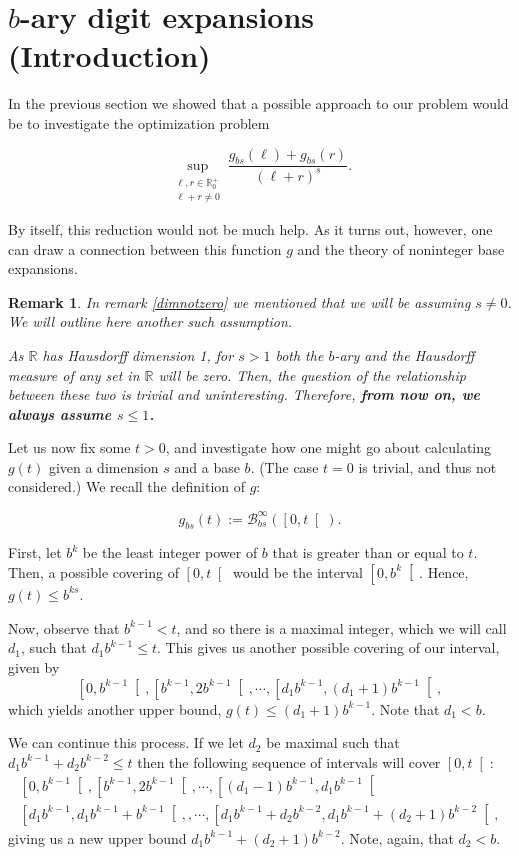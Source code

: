\documentclass[11pt, reqno]{amsart}
\newcommand{\R}{\mathbb{R}}
\newcommand{\BB}{\mathcal{B}}
\newtheorem{remark}{Remark}
\begin{document}
\section{$b$-ary digit expansions (Introduction)}\label{sec6}

In the previous section we showed that a possible approach to our problem would be to investigate the optimization problem

\[ \sup_{\substack{\ell,r \in \R^+_0\\\ell+r \neq 0}} \frac{g_{bs}(\ell) + g_{bs}(r)}{(\ell + r)^s}. \]

By itself, this reduction would not be much help. As it turns out, however, one can draw a connection between this function $g$ and the theory of noninteger base expansions.

\begin{remark}
In remark \ref{dimnotzero} we mentioned that we will be assuming $s \neq 0$. We will outline here another such assumption.

As $\R$ has Hausdorff dimension 1, for $s > 1$ both the $b$-ary and the Hausdorff measure of \emph{any} set in $\R$ will be zero. Then, the question of the relationship between these two is trivial and uninteresting. Therefore, \textbf{from now on, we always assume $s \leq 1$.}
\end{remark}

Let us now fix some $t > 0$, and investigate how one might go about calculating $g(t)$ given a dimension $s$ and a base $b$. (The case $t = 0$ is trivial, and thus not considered.) We recall the definition of $g$:

\[g_{bs}(t) := \BB_{bs}^\infty(\left[0, t \right[).\]

First, let $b^k$ be the least integer power of $b$ that is greater than or equal to $t$. Then, a possible covering of $\left[0, t \right[$ would be the interval $\left[0, b^k\right[$. Hence, $g(t) \leq b^{ks}$.

Now, observe that $b^{k-1} < t$, and so there is a maximal integer, which we will call $d_1$, such that $d_1 b^{k-1} \leq t$. This gives us another possible covering of our interval, given by
\[\left[0, b^{k-1} \right[, \left[b^{k-1}, 2 b^{k-1} \right[, \cdots, \left[d_1 b^{k-1}, (d_1 + 1) b^{k-1} \right[,\]
which yields another upper bound, $g(t) \leq (d_1 + 1) b^{k-1}$. Note that $d_1 < b$.

We can continue this process. If we let $d_2$ be maximal such that $d_1 b^{k-1} + d_2 b^{k-2} \leq t$ then the following sequence of intervals will cover $\left[0, t \right[$:
\begin{multline*}
\left[0, b^{k-1} \right[, \left[b^{k-1}, 2 b^{k-1} \right[, \cdots, \left[(d_1 - 1) b^{k-1}, d_1 b^{k-1} \right[ \\
\left[d_1 b^{k-1}, d_1 b^{k-1} + b^{k-1} \right[, , \cdots, \left[d_1 b^{k-1} + d_2 b^{k-2}, d_1 b^{k-1} + (d_2 + 1) b^{k-2} \right[,
\end{multline*}
giving us a new upper bound $d_1 b^{k-1} + (d_2 + 1) b^{k-2}$. Note, again, that $d_2 < b$.
\end{document}
